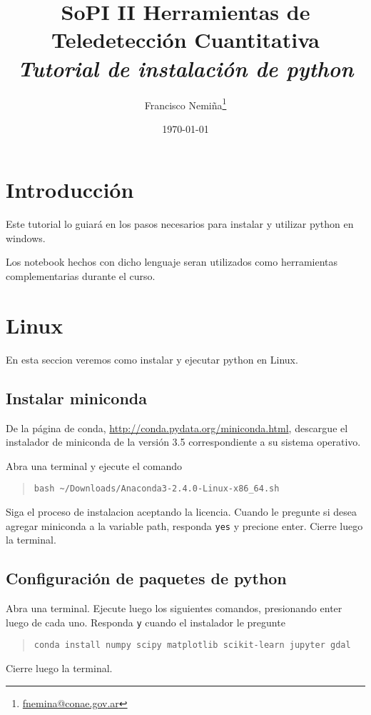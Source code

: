 \documentclass[hidelinks,12pt]{article}
\title{SoPI II \- Herramientas de Teledetecci\'on Cuantitativa \\ 
\emph{Tutorial de instalaci\'on de python}}
\author{Francisco
Nemi\~na\thanks{\href{mailto:fnemina@conae.govar}{fnemina@conae.gov.ar}}}
\affil{Unidad de Educaci\'on y Formaci\'on Masiva\\ 
    Comisi\'on Nacional de Actividades Espaciales}
\date{\today}
\begin{document}
\maketitle

\section*{Introducci\'on}
Este tutorial lo guiar\'a en los pasos necesarios para instalar y utilizar
python en windows.

Los notebook hechos con dicho lenguaje seran utilizados como herramientas
complementarias durante el curso.

\section{Linux}
En esta seccion veremos como instalar y ejecutar python en Linux.

\subsection{Instalar miniconda}

De la p\'agina de conda, \url{http://conda.pydata.org/miniconda.html}, descargue 
el instalador de miniconda de la versi\'on 3.5 correspondiente a su sistema operativo. 

Abra una terminal y ejecute el comando
\begin{quote}
\begin{verbatim}
bash ~/Downloads/Anaconda3-2.4.0-Linux-x86_64.sh
\end{verbatim}
\end{quote}
Siga el proceso de instalacion aceptando la licencia. Cuando le pregunte si
desea agregar miniconda a la variable path, responda \texttt{yes} y precione
enter. Cierre luego la terminal.

\subsection{Configuraci\'on de paquetes de python}

Abra una terminal. Ejecute luego los siguientes comandos, presionando enter
luego de cada uno. Responda \texttt{y} cuando el instalador le pregunte 
\begin{quote}
\begin{verbatim}
conda install numpy scipy matplotlib scikit-learn jupyter gdal
\end{verbatim}
\end{quote}
Cierre luego la terminal.
\end{document}
